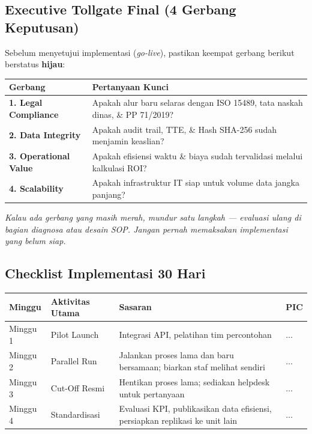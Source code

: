 \documentclass[11pt,a4paper]{article}
\begin{document}
\subsection{Executive Tollgate Final (4 Gerbang Keputusan)}
Sebelum menyetujui implementasi (\textit{go-live}), pastikan keempat gerbang berikut berstatus \textbf{hijau}:

\begin{table}[h!]
\centering\small
\begin{tabularx}{\textwidth}{@{} l X @{}}
\toprule
\textbf{Gerbang} & \textbf{Pertanyaan Kunci} \\
\midrule
\rowcolor{plngreen!5}
\textbf{1. Legal Compliance} & Apakah alur baru selaras dengan ISO 15489, tata naskah dinas, \& PP 71/2019? \\
\textbf{2. Data Integrity} & Apakah audit trail, TTE, \& Hash SHA-256 sudah menjamin keaslian? \\
\rowcolor{plngreen!5}
\textbf{3. Operational Value} & Apakah efisiensi waktu \& biaya sudah tervalidasi melalui kalkulasi ROI? \\
\textbf{4. Scalability} & Apakah infrastruktur IT siap untuk volume data jangka panjang? \\
\bottomrule
\end{tabularx}
\end{table}
\textit{Kalau ada gerbang yang masih merah, mundur satu langkah --- evaluasi ulang di bagian diagnosa atau desain SOP. Jangan pernah memaksakan implementasi yang belum siap.}

\subsection{Checklist Implementasi 30 Hari}
\begin{table}[h!]
\centering\small
\begin{tabularx}{\textwidth}{@{} l X X l @{}}
\toprule
\textbf{Minggu} & \textbf{Aktivitas Utama} & \textbf{Sasaran} & \textbf{PIC} \\
\midrule
\rowcolor{plngreen!5}
Minggu 1 & Pilot Launch & Integrasi API, pelatihan tim percontohan & $\ldots$ \\
Minggu 2 & Parallel Run & Jalankan proses lama dan baru bersamaan; biarkan staf melihat sendiri & $\ldots$ \\
\rowcolor{plngreen!5}
Minggu 3 & Cut-Off Resmi & Hentikan proses lama; sediakan helpdesk untuk pertanyaan & $\ldots$ \\
Minggu 4 & Standardisasi & Evaluasi KPI, publikasikan data efisiensi, persiapkan replikasi ke unit lain & $\ldots$ \\
\bottomrule
\end{tabularx}
\end{table}
\end{document}
